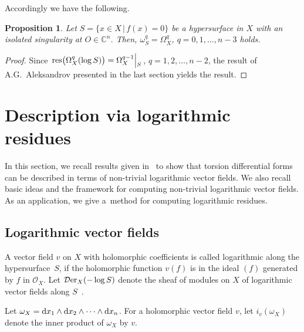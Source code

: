 \documentclass[pdftex]{sigma}%
\numberwithin{equation}{section}
\newtheorem{Proposition}[Theorem]{Proposition}
 { \theoremstyle{definition}
\newtheorem{Definition}[Theorem]{Definition}
\newtheorem{Remark}[Theorem]{Remark}
\newtheorem{Example}[Theorem]{Example}
 }
\begin{document}
Accordingly we have the following.

\begin{Proposition} Let $S = \{x \in X \,|\, f(x) = 0\}$ be a hypersurface in $X$
with an isolated sin\-gularity at $ O \in {\mathbb C}^n$. Then,
$\omega_S^{q} = \Omega_X^{q}$, $q=0,1,\ldots,n-3$ holds.
\end{Proposition}

\begin{proof}
Since $\left. {\rm res}\big(\Omega_X^{q}(\log S)\big) = \Omega_X^{q-1}\middle|\raisebox{-0.7ex}[1ex][-2ex]{{\hspace{-1mm}\;$_S$}} \right.$, $q=1,2,\ldots,n-2$, the result of A.G.~Aleksandrov presented in the last section yields the result.
\end{proof}


\section{Description via logarithmic residues}\label{sec3}

In this section, we recall results given in~\cite{TN20} to show that torsion differential forms can be des\-cri\-bed in terms of non-trivial logarithmic vector fields. We also recall basic ideas and the framework for computing non-trivial logarithmic vector fields. As an application,
we give a~method for computing logarithmic residues.

\subsection{Logarithmic vector fields}


A vector field $v$ on $X$ with holomorphic coefficients is called logarithmic
along the hyper\-sur\-face~$S$, if the holomorphic function $v(f)$ is in the ideal $(f)$ generated by $f$ in
${\mathcal O}_X$. Let ${\mathcal D}{\rm er}_{X}(-\log S) $ denote the sheaf of modules on $ X $ of logarithmic
vector fields along $S$~\cite{S}.

Let $\omega_X = {\rm d}x_1 \wedge {\rm d}x_2 \wedge \cdots \wedge {\rm d}x_n$. For a holomorphic vector field $v$,
let $i_{v}(\omega_X)$ denote the inner product of $\omega_X$ by $v$.
\end{document}
